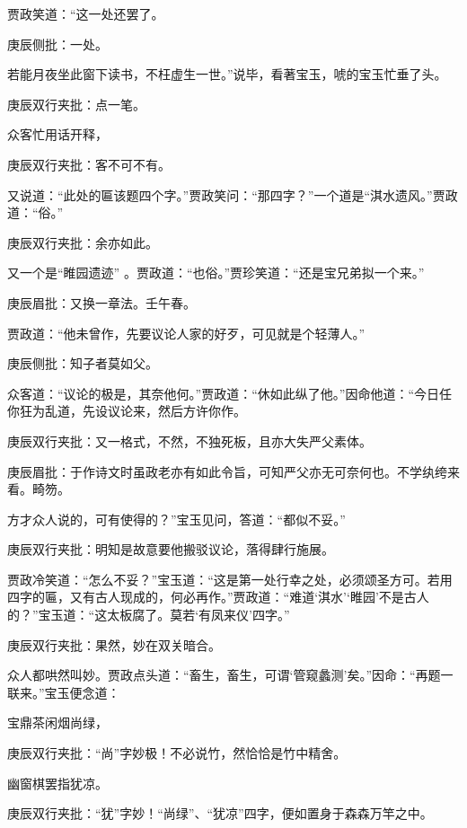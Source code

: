 \begin{parag}
    贾政笑道：“这一处还罢了。\begin{note}庚辰侧批：一处。\end{note}若能月夜坐此窗下读书，不枉虚生一世。”说毕，看著宝玉，唬的宝玉忙垂了头。\begin{note}庚辰双行夹批：点一笔。\end{note}众客忙用话开释，\begin{note}庚辰双行夹批：客不可不有。\end{note}又说道：“此处的匾该题四个字。”贾政笑问：“那四字？”一个道是“淇水遗风。”贾政道：“俗。”\begin{note}庚辰双行夹批：余亦如此。\end{note}又一个是“睢园遗迹” 。贾政道：“也俗。”贾珍笑道：“还是宝兄弟拟一个来。”\begin{note}庚辰眉批：又换一章法。壬午春。\end{note}贾政道：“他未曾作，先要议论人家的好歹，可见就是个轻薄人。”\begin{note}庚辰侧批：知子者莫如父。\end{note}众客道：“议论的极是，其奈他何。”贾政道：“休如此纵了他。”因命他道：“今日任你狂为乱道，先设议论来，然后方许你作。\begin{note}庚辰双行夹批：又一格式，不然，不独死板，且亦大失严父素体。\end{note}\begin{note}庚辰眉批：于作诗文时虽政老亦有如此令旨，可知严父亦无可奈何也。不学纨绔来看。畸笏。\end{note}方才众人说的，可有使得的？”宝玉见问，答道：“都似不妥。”\begin{note}庚辰双行夹批：明知是故意要他搬驳议论，落得肆行施展。\end{note}贾政冷笑道：“怎么不妥？”宝玉道：“这是第一处行幸之处，必须颂圣方可。若用四字的匾，又有古人现成的，何必再作。”贾政道：“难道‘淇水’‘睢园’不是古人的？”宝玉道：“这太板腐了。莫若‘有凤来仪’四字。”\begin{note}庚辰双行夹批：果然，妙在双关暗合。\end{note}众人都哄然叫妙。贾政点头道：“畜生，畜生，可谓‘管窥蠡测’矣。”因命：“再题一联来。”宝玉便念道：
\end{parag}
\begin{poem}

    \begin{pl}宝鼎茶闲烟尚绿，\end{pl}
    \begin{note}庚辰双行夹批：“尚”字妙极！不必说竹，然恰恰是竹中精舍。\end{note}
    \begin{pl}幽窗棋罢指犹凉。\end{pl}
    \begin{note}庚辰双行夹批：“犹”字妙！“尚绿”、“犹凉”四字，便如置身于森森万竿之中。\end{note}
\end{poem}


